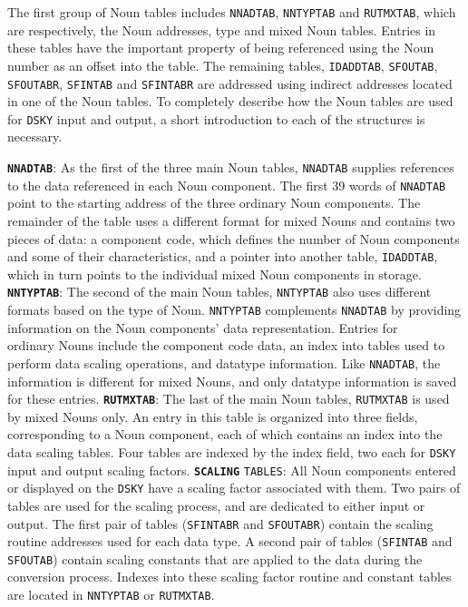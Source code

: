 \documentclass[refcap, oxford]{ahsan}
\begin{document}
The first group of Noun tables includes \texttt{NNADTAB}, \texttt{NNTYPTAB} and \texttt{RUTMXTAB}, which are respectively, the Noun addresses, type and mixed Noun tables. Entries in these tables have the important property of being referenced using the Noun number as an offset into the table. The remaining tables, \texttt{IDADDTAB}, \texttt{SFOUTAB}, \texttt{SFOUTABR}, \texttt{SFINTAB} and \texttt{SFINTABR} are addressed using indirect addresses located in one of the Noun tables. To completely describe how the Noun tables are used for \texttt{DSKY} input and output, a short introduction to each of the structures is necessary.

\textbf{\texttt{NNADTAB}}: As the first of the three main Noun tables, \texttt{NNADTAB} supplies references to the data referenced in each Noun component. The first 39 words of \texttt{NNADTAB} point to the starting address of the three ordinary Noun components. The remainder of the table uses a different format for mixed Nouns and contains two pieces of data: a component code, which defines the number of Noun components and some of their characteristics, and a pointer into another table, \texttt{IDADDTAB}, which in turn points to the individual mixed Noun components in storage.
\textbf{}
\textbf{\texttt{NNTYPTAB}}: The second of the main Noun tables, \texttt{NNTYPTAB} also uses different formats based on the type of Noun. \texttt{NNTYPTAB} complements \texttt{NNADTAB} by providing information on the Noun components' data representation. Entries for\\
\textbf{}ordinary Nouns include the component code data, an index into tables used to perform data scaling operations, and datatype information. Like \texttt{NNADTAB}, the information is different for mixed Nouns, and only datatype information is saved for these entries.
\textbf{}
\textbf{\texttt{RUTMXTAB}}: The last of the main Noun tables, \texttt{RUTMXTAB} is used by mixed Nouns only. An entry in this table is organized into three fields, corresponding to a Noun component, each of which contains an index into the data scaling tables. Four tables are indexed by the index field, two each for \texttt{DSKY} input and output scaling factors.
\textbf{}
\textbf{\texttt{SCALING}} \texttt{TABLES}: All Noun components entered or displayed on the \texttt{DSKY} have a scaling factor associated with them. Two pairs of tables are used for the scaling process, and are dedicated to either input or output. The first pair of tables (\texttt{SFINTABR} and \texttt{SFOUTABR}) contain the scaling routine addresses used for each data type. A second pair of tables (\texttt{SFINTAB} and \texttt{SFOUTAB}) contain scaling constants that are applied to the data during the conversion process. Indexes into these scaling factor routine and constant tables are located in \texttt{NNTYPTAB} or \texttt{RUTMXTAB}.
\end{document}
